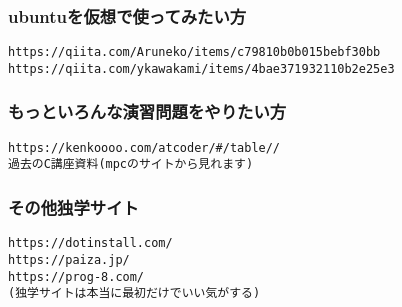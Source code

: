 \subsubsection{ubuntuを仮想で使ってみたい方}
\begin{verbatim}
https://qiita.com/Aruneko/items/c79810b0b015bebf30bb
https://qiita.com/ykawakami/items/4bae371932110b2e25e3
\end{verbatim}
\subsubsection{もっといろんな演習問題をやりたい方}
\begin{verbatim}
https://kenkoooo.com/atcoder/#/table//
過去のC講座資料(mpcのサイトから見れます)
\end{verbatim}
\subsubsection{その他独学サイト}
\begin{verbatim}
https://dotinstall.com/
https://paiza.jp/
https://prog-8.com/
(独学サイトは本当に最初だけでいい気がする)
\end{verbatim}
